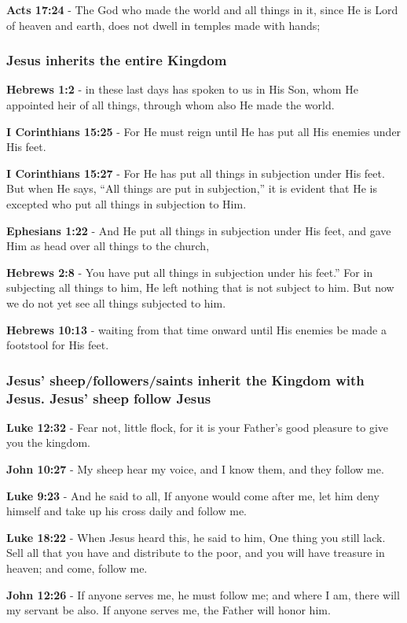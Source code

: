 \documentclass[11pt]{article}
\begin{document}
\textbf{Acts 17:24} - The God who made the world and all things in it, since He is Lord of heaven and earth, does not dwell in temples made with hands;

\subsubsection{Jesus inherits the entire Kingdom}
\label{sec:orgf1c29ba}
\textbf{Hebrews 1:2} - in these last days has spoken to us in His Son, whom He appointed heir of all things, through whom also He made the world.

\textbf{I Corinthians 15:25} - For He must reign until He has put all His enemies under His feet.

\textbf{I Corinthians 15:27} - For He has put all things in subjection under His feet. But when He says, “All things are put in subjection,” it is evident that He is excepted who put all things in subjection to Him.

\textbf{Ephesians 1:22} - And He put all things in subjection under His feet, and gave Him as head over all things to the church,

\textbf{Hebrews 2:8} - You have put all things in subjection under his feet.” For in subjecting all things to him, He left nothing that is not subject to him. But now we do not yet see all things subjected to him.

\textbf{Hebrews 10:13} - waiting from that time onward until His enemies be made a footstool for His feet.

\subsubsection{Jesus' sheep/followers/saints inherit the Kingdom with Jesus. Jesus' sheep follow Jesus}
\label{sec:org1707181}
\textbf{Luke 12:32} - Fear not, little flock, for it is your Father's good pleasure to give you the kingdom.

\textbf{John 10:27} - My sheep hear my voice, and I know them, and they follow me.

\textbf{Luke 9:23} - And he said to all, If anyone would come after me, let him deny himself and take up his cross daily and follow me.

\textbf{Luke 18:22} - When Jesus heard this, he said to him, One thing you still lack. Sell all that you have and distribute to the poor, and you will have treasure in heaven; and come, follow me.

\textbf{John 12:26} - If anyone serves me, he must follow me; and where I am, there will my servant be also. If anyone serves me, the Father will honor him.
\end{document}
